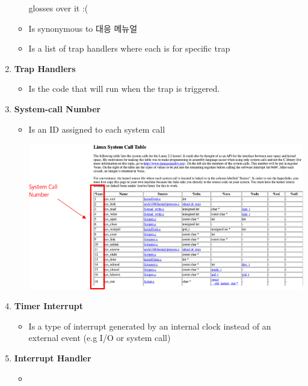 \documentclass[12pt]{article}
\begin{document}
\begin{mdframed}
\begin{enumerate}[1.]
\begin{itemize}
        glosses over it :(
        \item Is synonymous to 대응 메뉴얼
        \item Is a list of trap handlers where each is for specific trap
    \end{itemize}
    \item \textbf{Trap Handlers}
    \begin{itemize}
        \item Is the code that will run when the trap is triggered.
    \end{itemize}
    \item \textbf{System-call Number}
    \begin{itemize}
        \item Is an ID assigned to each system call

        \bigskip

        \begin{center}
        \includegraphics[width=0.9\linewidth]{images/notes_4_7.png}
        \end{center}
    \end{itemize}
    \item \textbf{Timer Interrupt}
    \begin{itemize}
        \item Is a type of interrupt generated by an internal clock instead of an external event (e.g I/O or system call)
    \end{itemize}
    \item \textbf{Interrupt Handler}
    \begin{itemize}
        \item
    \end{itemize}
\end{enumerate}

\end{mdframed}
\end{document}
